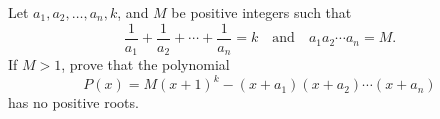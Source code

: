 Let $a_1,a_2,\ldots,a_n,k$, and $M$ be positive integers such that \[\frac{1}{a_1}+\frac{1}{a_2}+\cdots+\frac{1}{a_n}=k\quad\text{and}\quad a_1a_2\cdots a_n=M.\] If $M>1$, prove that the polynomial \[P\left(x\right)=M\left(x+1\right)^k-\left(x+a_1\right)\left(x+a_2\right)\cdots\left(x+a_n\right)\] has no positive roots.